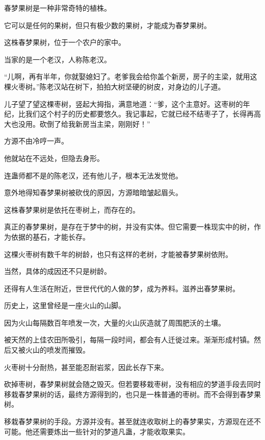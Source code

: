 
\begin{this_body}



春梦果树是一种非常奇特的植株。

它可以是任何的果树，但只有极少数的果树，才能成为春梦果树。

这株春梦果树，位于一个农户的家中。

当家的是一个老汉，人称陈老汉。

“儿啊，再有半年，你就娶媳妇了。老爹我会给你盖个新房，房子的主梁，就用这棵火枣树。”陈老汉站在树下，拍拍大树坚硬的树皮，对身边的儿子道。

儿子望了望这棵枣树，竖起大拇指，满意地道：“爹，这个主意好。这枣树的年纪，比我们这个村子的历史都要悠久。我记事起，它就已经不结枣子了，长得再高大也没用。砍倒了给我新房当主梁，刚刚好！”

方源不由冷哼一声。

他就站在不远处，但隐去身形。

连蛊师都不是的陈老汉，还有他儿子，根本无法发觉他。

意外地得知春梦果树被砍伐的原因，方源暗暗皱起眉头。

这株春梦果树是依托在枣树上，而存在的。

真正的春梦果树，是存在于梦中的树，并没有实体。但它需要一株现实中的树，作为依据的基石，才能长存。

这棵火枣树有数千年的树龄，也只有这样的老树，才能被春梦果树依附。

当然，具体的成因还不只是树龄。

还得有人生活在附近，世世代代的人做的梦，成为养料。滋养出春梦果树。

历史上，这里曾经是一座火山的山脚。

因为火山每隔数百年喷发一次，大量的火山灰造就了周围肥沃的土壤。

被天然的上佳农田所吸引，每隔一段时间，都会有人迁徙过来。渐渐形成村镇。然后又被火山的喷发而摧毁。

火枣树十分耐热，甚至能忍耐岩浆，因此长存下来。

砍掉枣树，春梦果树就会随之毁灭。但若要移栽枣树，没有相应的梦道手段去同时移栽春梦果树的话，最终方源得到的，也只是一株普通的枣树。而不会得到春梦果树。

移栽春梦果树的手段。方源并没有。甚至就连收取树上的春梦果实，方源现在还不可能。他还需要炼出一些针对的梦道凡蛊，才能收取果实。


\end{this_body}
